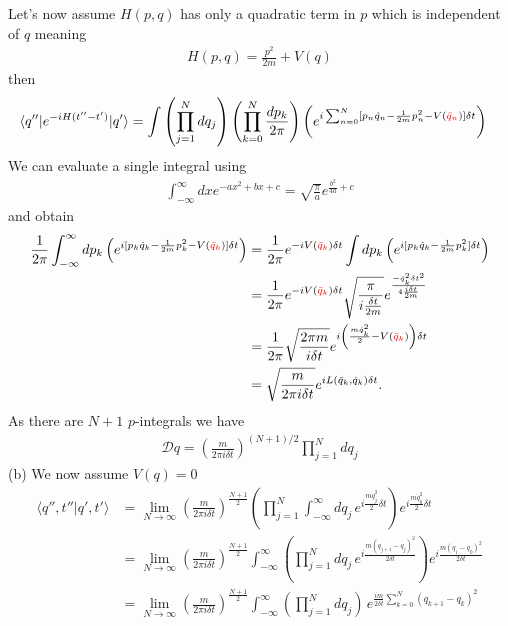 \documentclass[10pt,a4paper]{article}
\theoremstyle{definition}
\begin{document}
Let's now assume $H(p,q)$ has only a quadratic term in $p$ which is independent of $q$ meaning
\begin{align}
    H(p,q)=\frac{p^2}{2m}+V(q)
\end{align}
then
\begin{align}
\langle q''|e^{-iH(t''-t')}|q'\rangle
        &=\int\left(\prod_{j=1}^N dq_j\right)\left(\prod_{k=0}^{N}\frac{dp_k}{2\pi}\right) \left(e^{i\sum_{n=0}^N[p_n\dot{q}_n-\frac{1}{2m}p_n^2-V(\textcolor{red}{\bar{q}_n})]\delta t}\right)
\end{align}
We can evaluate a single integral using
\begin{align}
    \int_{-\infty}^\infty dx e^{-ax^2+bx+c}=\sqrt{\frac{\pi}{a}}e^{\frac{b^2}{4a}+c}
\end{align}
and obtain
\begin{align}
        \frac{1}{2\pi}\int_{-\infty}^\infty dp_k \left(e^{i[p_k\dot{q}_k-\frac{1}{2m}p_k^2-V(\textcolor{red}{\bar{q}_k})]\delta t}\right)
        &=\frac{1}{2\pi}e^{-iV(\textcolor{red}{\bar{q}_k})\delta t}\int dp_k \left(e^{i[p_k\dot{q}_k-\frac{1}{2m}p_k^2]\delta t}\right)\\
        &=\frac{1}{2\pi}e^{-iV(\textcolor{red}{\bar{q}_k})\delta t}\sqrt{\frac{\pi}{i\frac{\delta t}{2m}}} e^{\frac{-\dot{q}_k^2\delta t^2}{4\frac{i\delta t}{2m}}}\\
        &=\frac{1}{2\pi}\sqrt{\frac{2\pi m}{i\delta t}} e^{i\left(\frac{m\dot{q}_k^2}{2}-V(\textcolor{red}{\bar{q}_k})\right)\delta t}\\
        &=\sqrt{\frac{m}{2\pi i\delta t}} e^{iL(\bar{q}_k,\dot{q}_k)\delta t}.
\end{align}
As there are $N+1$ $p$-integrals we have
\begin{align}
    \mathcal{D}q=\left(\frac{m}{2\pi i\delta t}\right)^{(N+1)/2}\prod_{j=1}^N dq_j
\end{align}
(b) We now assume $V(q)=0$
\begin{align}
    \langle q'',t''|q',t'\rangle
    &=\lim_{N\rightarrow\infty}\left(\frac{m}{2\pi i\delta t}\right)^\frac{N+1}{2}\left(\prod_{j=1}^N \int_{-\infty}^{\infty}dq_j\, e^{i\frac{m\dot{q}_j^2}{2}\delta t}\right)e^{i\frac{m\dot{q}_0^2}{2}\delta t}\\
    &=\lim_{N\rightarrow\infty}\left(\frac{m}{2\pi i\delta t}\right)^\frac{N+1}{2}\int_{-\infty}^{\infty}\left(\prod_{j=1}^N dq_j\, e^{i\frac{m(q_{j+1}-q_j)^2}{2\delta t}}\right)e^{i\frac{m(q_1-q_0)^2}{2\delta t}}\\
    &=\lim_{N\rightarrow\infty}\left(\frac{m}{2\pi i\delta t}\right)^\frac{N+1}{2}\int_{-\infty}^{\infty}\left(\prod_{j=1}^N dq_j\right)\,e^{\frac{im}{2\delta t}\sum_{k=0}^N(q_{k+1}-q_k)^2}
\end{align}
\end{document}
